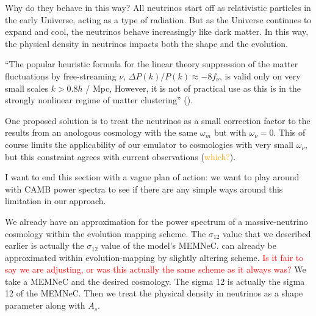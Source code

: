 Why do they behave in this way? All neutrinos start off as
relativistic particles in the early Universe, acting as a type of radiation.
But as the Universe continues to expand and cool, the neutrinos behave
increasingly like dark matter.
In this way, the physical density in neutrinos impacts both the shape and the
evolution.

``The popular heuristic formula for the linear theory suppression of the matter
fluctuations by free-streaming $\nu$, $\Delta P(k) / P(k) \approx -8 f_\nu$, is
valid only on very small scales $k > 0.8 h$ / Mpc, However, it is not of
practical use as this is in the strongly nonlinear regime of matter
clustering'' ().

One proposed solution is to treat the neutrinos as a small correction factor
to the results from an anologous cosmology with the same $\omega_m$ but with
$\omega_\nu = 0$. This of course limits the applicability of our emulator to
cosmologies with very small $\omega_\nu$, but this constraint agrees with
current observations (\textcolor{orange}{which?}).

I want to end this section with a vague plan of action: we want to play around with CAMB power spectra to see if there are any simple ways around this limitation in our approach.


We already have an approximation for the power spectrum of a massive-neutrino cosmology within the evolution mapping scheme. The $\sigma_{12}$ value that we described earlier is actually the $\sigma_{12}$ value of the model's MEMNeC. can already be approximated within evolution-mapping by slightly altering scheme. \textcolor{red}{Is it fair to say we are adjusting, or was this actually the same scheme as it always was?} We take a MEMNeC and the desired cosmology. The sigma 12 is actually the sigma 12 of the MEMNeC. Then we treat the physical density in neutrinos as a shape parameter along with $A_s$.
